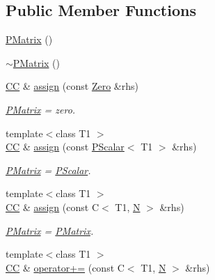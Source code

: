 \subsection*{Public Member Functions}
\begin{DoxyCompactItemize}
\item 
\mbox{\hyperlink{classENSEM_1_1PMatrix_ae32acebccb43c577a9e4dde0866a6c78}{P\+Matrix}} ()
\item 
\mbox{\hyperlink{classENSEM_1_1PMatrix_a3196ba50adba3cc1e72bb29ce0b02cda}{$\sim$\+P\+Matrix}} ()
\item 
\mbox{\hyperlink{classENSEM_1_1PMatrix_a744bac549029029effe32dc1705660ec}{CC}} \& \mbox{\hyperlink{classENSEM_1_1PMatrix_a4d8aeb469d2295dc8c555a0180ab0613}{assign}} (const \mbox{\hyperlink{structENSEM_1_1Zero}{Zero}} \&rhs)
\begin{DoxyCompactList}\small\item\em \mbox{\hyperlink{classENSEM_1_1PMatrix}{P\+Matrix}} = zero. \end{DoxyCompactList}\item 
{\footnotesize template$<$class T1 $>$ }\\\mbox{\hyperlink{classENSEM_1_1PMatrix_a744bac549029029effe32dc1705660ec}{CC}} \& \mbox{\hyperlink{classENSEM_1_1PMatrix_aa9ba4e8c3935c0591c0b63daef8edaa5}{assign}} (const \mbox{\hyperlink{classENSEM_1_1PScalar}{P\+Scalar}}$<$ T1 $>$ \&rhs)
\begin{DoxyCompactList}\small\item\em \mbox{\hyperlink{classENSEM_1_1PMatrix}{P\+Matrix}} = \mbox{\hyperlink{classENSEM_1_1PScalar}{P\+Scalar}}. \end{DoxyCompactList}\item 
{\footnotesize template$<$class T1 $>$ }\\\mbox{\hyperlink{classENSEM_1_1PMatrix_a744bac549029029effe32dc1705660ec}{CC}} \& \mbox{\hyperlink{classENSEM_1_1PMatrix_ac3c0e489c8c8011edc4ea93477176b84}{assign}} (const C$<$ T1, \mbox{\hyperlink{operator__name__util_8cc_a7722c8ecbb62d99aee7ce68b1752f337}{N}} $>$ \&rhs)
\begin{DoxyCompactList}\small\item\em \mbox{\hyperlink{classENSEM_1_1PMatrix}{P\+Matrix}} = \mbox{\hyperlink{classENSEM_1_1PMatrix}{P\+Matrix}}. \end{DoxyCompactList}\item 
{\footnotesize template$<$class T1 $>$ }\\\mbox{\hyperlink{classENSEM_1_1PMatrix_a744bac549029029effe32dc1705660ec}{CC}} \& \mbox{\hyperlink{classENSEM_1_1PMatrix_af6bd651888f2621169845b757b2200ee}{operator+=}} (const C$<$ T1, \mbox{\hyperlink{operator__name__util_8cc_a7722c8ecbb62d99aee7ce68b1752f337}{N}} $>$ \&rhs)

\end{DoxyCompactItemize}
